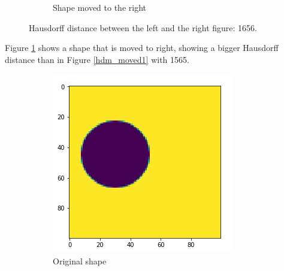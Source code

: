 \begin{figure}[H]
\begin{subfigure}{.35\textwidth}
        \caption{Shape moved to the right}
    \end{subfigure}
    \caption{Hausdorff distance between the left and the right figure: 1656. }
    \label{hdm_moved2}
\end{figure}

Figure \ref{hdm_moved2} shows a shape that is moved to right, showing a bigger Hausdorff distance than in Figure \ref{hdm_moved1} with 1565.

\begin{figure}[H]
    \centering
    \begin{subfigure}{.35\textwidth}
        \centering
        \includegraphics[width=\linewidth]{chapters/06_hdm/images/hdm_original.png}
        \caption{Original shape}
    \end{subfigure}%
    \begin{subfigure}{.35\textwidth}
        \centering

\end{subfigure}
\end{figure}
